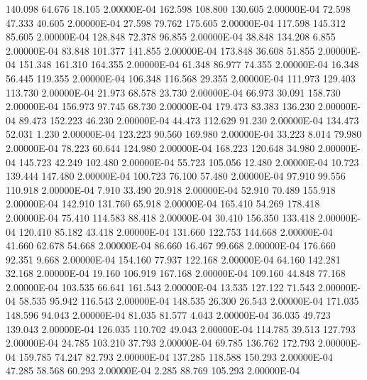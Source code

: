    140.098    64.676    18.105  2.00000E-04
   162.598   108.800   130.605  2.00000E-04
    72.598    47.333    40.605  2.00000E-04
    27.598    79.762   175.605  2.00000E-04
   117.598   145.312    85.605  2.00000E-04
   128.848    72.378    96.855  2.00000E-04
    38.848   134.208     6.855  2.00000E-04
    83.848   101.377   141.855  2.00000E-04
   173.848    36.608    51.855  2.00000E-04
   151.348   161.310   164.355  2.00000E-04
    61.348    86.977    74.355  2.00000E-04
    16.348    56.445   119.355  2.00000E-04
   106.348   116.568    29.355  2.00000E-04
   111.973   129.403   113.730  2.00000E-04
    21.973    68.578    23.730  2.00000E-04
    66.973    30.091   158.730  2.00000E-04
   156.973    97.745    68.730  2.00000E-04
   179.473    83.383   136.230  2.00000E-04
    89.473   152.223    46.230  2.00000E-04
    44.473   112.629    91.230  2.00000E-04
   134.473    52.031     1.230  2.00000E-04
   123.223    90.560   169.980  2.00000E-04
    33.223     8.014    79.980  2.00000E-04
    78.223    60.644   124.980  2.00000E-04
   168.223   120.648    34.980  2.00000E-04
   145.723    42.249   102.480  2.00000E-04
    55.723   105.056    12.480  2.00000E-04
    10.723   139.444   147.480  2.00000E-04
   100.723    76.100    57.480  2.00000E-04
    97.910    99.556   110.918  2.00000E-04
     7.910    33.490    20.918  2.00000E-04
    52.910    70.489   155.918  2.00000E-04
   142.910   131.760    65.918  2.00000E-04
   165.410    54.269   178.418  2.00000E-04
    75.410   114.583    88.418  2.00000E-04
    30.410   156.350   133.418  2.00000E-04
   120.410    85.182    43.418  2.00000E-04
   131.660   122.753   144.668  2.00000E-04
    41.660    62.678    54.668  2.00000E-04
    86.660    16.467    99.668  2.00000E-04
   176.660    92.351     9.668  2.00000E-04
   154.160    77.937   122.168  2.00000E-04
    64.160   142.281    32.168  2.00000E-04
    19.160   106.919   167.168  2.00000E-04
   109.160    44.848    77.168  2.00000E-04
   103.535    66.641   161.543  2.00000E-04
    13.535   127.122    71.543  2.00000E-04
    58.535    95.942   116.543  2.00000E-04
   148.535    26.300    26.543  2.00000E-04
   171.035   148.596    94.043  2.00000E-04
    81.035    81.577     4.043  2.00000E-04
    36.035    49.723   139.043  2.00000E-04
   126.035   110.702    49.043  2.00000E-04
   114.785    39.513   127.793  2.00000E-04
    24.785   103.210    37.793  2.00000E-04
    69.785   136.762   172.793  2.00000E-04
   159.785    74.247    82.793  2.00000E-04
   137.285   118.588   150.293  2.00000E-04
    47.285    58.568    60.293  2.00000E-04
     2.285    88.769   105.293  2.00000E-04
